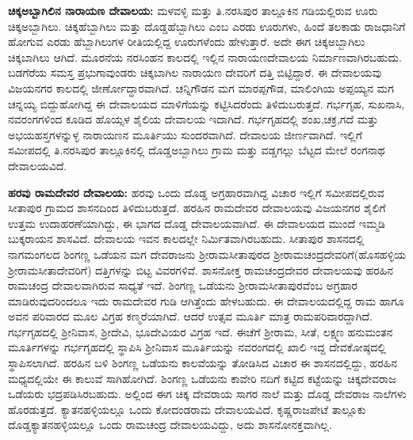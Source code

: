 \textbf{ಚಿಕ್ಕಅಬ್ಬಾಗಿಲಿನ ನಾರಾಯಣ ದೇವಾಲಯ:} ಮಳವಳ್ಳಿ ಮತ್ತು ತಿ.ನರಸಿಪುರ ತಾಲ್ಲೂಕಿನ ಗಡಿಯಲ್ಲಿರುವ ಊರು ಚಿಕ್ಕಅಬ್ಬಾಗಿಲು. ಚಿಕ್ಕಹೆಬ್ಬಾಗಿಲು ಮತ್ತು ದೊಡ್ಡಹೆಬ್ಬಾಗಿಲು ಎಂಬ ಎರಡು ಊರುಗಳು, ಹಿಂದೆ ತಲಕಾಡು ರಾಜಧಾನಿಗೆ ಹೋಗುವ ಎರಡು ಹೆಬ್ಬಾಗಿಲುಗಳ ರೀತಿಯಲ್ಲಿದ್ದ ಊರುಗಳೆಂದು ಹೇಳುತ್ತಾರೆ. ಅದೇ ಈಗ ಚಿಕ್ಕಅಬ್ಬಾಗಿಲು ಚಿಕ್ಕಬಾಗಿಲು ಆಗಿದೆ. ಮೂರನೆಯ ನರಸಿಂಹನ ಕಾಲದಲ್ಲಿ ಇಲ್ಲಿನ ನಾರಾಯಣದೇವಾಲಯ ನಿರ್ಮಾಣವಾಗಿರಬಹುದು. ಬಡಗೆರೆಯ ಸಮಸ್ತ ಪ್ರಭುಗಾವುಂಡರು ಚಿಕ್ಕಬಾಗಿಲ ನಾರಾಯಣ ದೇವರಿಗೆ ದತ್ತಿ ಬಿಟ್ಟಿದ್ದಾರೆ. ಈ ದೇವಾಲಯವು ವಿಜಯನಗರ ಕಾಲದಲ್ಲಿ ಜೀರ್ಣೋದ್ಧಾರವಾಗಿದೆ. ಚನ್ನಿಗೌಡನ ಮಗ ಮಾರಪ್ಪಗೌಡ, ಮಾಲಿಂಗಿಯ ಅಪ್ಪಯ್ಯನ ಮಗ ಚನ್ನಯ್ಯ ಬಿದ್ದುಹೋಗಿದ್ದ ಈ ದೇವಾಲಯದ ಮಾಳಿಗೆಯನ್ನು ಕಟ್ಟಿಸಿದರೆಂದು ತಿಳಿದುಬರುತ್ತದೆ. ಗರ್ಭಗೃಹ, ಸುಖನಾಸಿ, ನವರಂಗ\-ಗಳಿಂದ ಕೂಡಿದ ಹೊಯ್ಸಳ ಶೈಲಿಯ ದೇವಾಲಯ ಇದಾಗಿದೆ. ಗರ್ಭಗೃಹದಲ್ಲಿ ಶಂಖ,ಚಕ್ರ,ಗದೆ ಮತ್ತು ಅಭಯಹಸ್ತಗಳನ್ನುಳ್ಳ ನಾರಾಯಣನ ಮೂರ್ತಿಯು ಸುಂದರವಾಗಿದೆ. ದೇವಾಲಯ ಜೀರ್ಣವಾಗಿದೆ. ಇಲ್ಲಿಗೆ ಸಮೀಪದಲ್ಲಿ ತಿ.ನರಸಿಪುರ ತಾಲ್ಲೂಕಿನಲ್ಲಿ ದೊಡ್ಡಅಬ್ಬಾಗಿಲು ಗ್ರಾಮ ಮತ್ತು ವಡ್ಡಗಲ್ಲು ಬೆಟ್ಟದ ಮೇಲೆ ರಂಗನಾಥ ದೇವಾಲಯವಿದೆ.

\vskip 2pt

\textbf{ಹರವು ರಾಮದೇವರ ದೇವಾಲಯ:} ಹರವು ಒಂದು ದೊಡ್ಡ ಅಗ್ರಹಾರವಾಗಿದ್ದ ವಿಚಾರ ಇಲ್ಲಿಗೆ ಸಮೀಪದಲ್ಲಿರುವ ಸೀತಾಪುರ ಗ್ರಾಮದ ಶಾಸನದಿಂದ ತಿಳಿದುಬರುತ್ತದೆ. ಹರಹಿನ ರಾಮದೇವರ ದೇವಾಲಯವು ವಿಜಯನಗರ ಶೈಲಿಗೆ ಉತ್ತಮ ಉದಾಹರಣೆಯಾಗಿದ್ದು, ಈ ಭಾಗದ ದೊಡ್ಡ ದೇವಾಲಯವಾಗಿದೆ. ಈ ದೇವಾಲಯದ ಮುಂದೆ ಇಮ್ಮಡಿ ಬುಕ್ಕರಾಯನ ಶಾಸವಿದೆ. ದೇವಾಲಯ ಇವನ ಕಾಲದಲ್ಲೇ ನಿರ್ಮಿತವಾಗಿರಬಹುದು. ಸೀತಾಪುರ ಶಾಸನದಲ್ಲಿ ನಾಗಮಂಗಲದ ಶಿಂಗಣ್ಣ ಒಡೆಯನ ಮಗ ದೇವರಾಜನು ಶ‍್ರೀರಾಮಸೀತಾಪುರದ ಶ‍್ರೀರಾಮಚಂದ್ರದೇವರಿಗೆ(ಹೊಸಹಳ್ಳಿಯ ಶ‍್ರೀರಾಮಸೀತಾದೇವರಿಗೆ) ದತ್ತಿಗಳನ್ನು ಬಿಟ್ಟ ವಿವರಗಳಿವೆ. ಶಾಸನೋಕ್ತ ರಾಮಚಂದ್ರದೇವರ ದೇವಾಲಯವು ಹರಹಿನ ರಾಮಚಂದ್ರ ದೇವಾಲವಾಗಿರುವ ಸಾಧ್ಯತೆ ಇದೆ. ಶಿಂಗಣ್ಣ ಒಡೆಯನು ಶ‍್ರೀರಾಮಸೀತಾಪುರವೆಂಬ ಅಗ್ರಹಾರ ಮಾಡಿರುವುದರಿಂದಲೂ ಇದು ರಾಮದೇವರ ಗುಡಿ ಆಗಿತ್ತೆಂದು ಹೇಳಬಹುದು. ಈ ದೇವಾಲಯದಲ್ಲಿದ್ದ ರಾಮ ಹಾಗೂ ಅವನ ಪರಿವಾರದ ಮೂಲ ವಿಗ್ರಹ ಕಣ್ಮರೆಯಾಗಿದೆ. ಆದರೆ ಉತ್ಸವ ಮೂರ್ತಿ ಮಾತ್ರ ರಾಮಪರಿವಾರದ್ದಾಗಿದೆ. ಗರ್ಭಗೃಹದಲ್ಲಿ ಶ‍್ರೀನಿವಾಸ, ಶ‍್ರೀದೇವಿ, ಭೂದೇವಿಯರ ವಿಗ್ರಹ ಇದೆ. ಈಚೆಗೆ ಶ‍್ರೀರಾಮ, ಸೀತೆ, ಲಕ್ಷ್ಮಣ ಹನುಮಂತನ ಮೂರ್ತಿಗಳನ್ನು ಗರ್ಭಗೃಹದಲ್ಲಿ ಸ್ಥಾಪಿಸಿ ಶ‍್ರೀನಿವಾಸ ಮೂರ್ತಿಯನ್ನು ನವರಂಗದಲ್ಲಿ ಖಾಲಿ ಇದ್ದ ದೇವಕೋಷ್ಠದಲ್ಲಿ ಸ್ಥಾಪಿಸಲಾಗಿದೆ. ಹರಹಿನ ಬಳಿ ಶಿಂಗಣ್ಣ ಒಡೆಯನು ಕಾಲವೆಯನ್ನು ತೋಡಿಸಿದ ವಿಚಾರ ಈ ಶಾಸನದಲ್ಲಿದ್ದು, ಹರಹಿನ ಮಧ್ಯದಲ್ಲಿಯೇ ಈ ಕಾಲುವೆ ಸಾಗಿಹೋಗಿದೆ. ಶಿಂಗಣ್ಣ ಒಡೆಯನು ಕಾವೇರಿ ನದಿಗೆ ಕಟ್ಟಿದ ಕಟ್ಟೆಯನ್ನು ಚಿಕ್ಕದೇವರಾಜ ಒಡೆಯರು ಭದ್ರಪಡಿಸಿರಬಹುದು. ಅಲ್ಲಿಂದ ಈಗ ಚಿಕ್ಕ ದೇವರಾಯ ಸಾಗರ ನಾಲೆ ಮತ್ತು ದೊಡ್ಡ ದೇವರಾಜ ನಾಲೆ\-ಗಳು ಹೊರಡುತ್ತದೆ. ಕ್ಯಾತನಹಳ್ಳಿಯಲ್ಲೂ ಒಂದು ಕೋದಂಡರಾಮ ದೇವಾಲಯವಿದೆ. ಕೃಷ್ಣರಾಜಪೇಟೆ ತಾಲ್ಲೂಕು ದೊಡ್ಡಕ್ಯಾತನಹಳ್ಳಿಯಲ್ಲೂ ಒಂದು ರಾಮಚಂದ್ರ ದೇವಾಲಯವಿದ್ದು, ಅದು ಶಾಸನೋನಕ್ತವಾಗಿಲ್ಲ.

